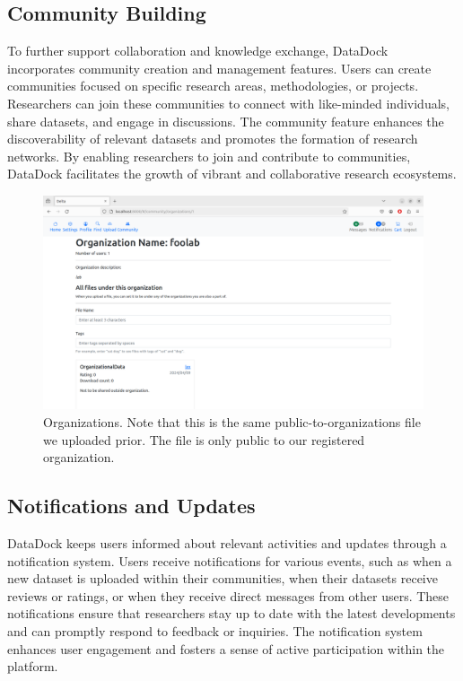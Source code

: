 \documentclass[conference]{IEEEtran}
\begin{document}
\subsection{Community Building}
To further support collaboration and knowledge exchange, DataDock incorporates community creation and management features. Users can create communities focused on specific research areas, methodologies, or projects. Researchers can join these communities to connect with like-minded individuals, share datasets, and engage in discussions. The community feature enhances the discoverability of relevant datasets and promotes the formation of research networks. By enabling researchers to join and contribute to communities, DataDock facilitates the growth of vibrant and collaborative research ecosystems.
\begin{figure}[h]
  \centering
  \includegraphics[width=\columnwidth]{figures/organization.png}
  \caption{Organizations. Note that this is the same public-to-organizations file we uploaded prior. The file is only public to our registered organization.}
  \label{fig:delta-organization}
\end{figure}

\subsection{Notifications and Updates}
DataDock keeps users informed about relevant activities and updates through a notification system. Users receive notifications for various events, such as when a new dataset is uploaded within their communities, when their datasets receive reviews or ratings, or when they receive direct messages from other users. These notifications ensure that researchers stay up to date with the latest developments and can promptly respond to feedback or inquiries. The notification system enhances user engagement and fosters a sense of active participation within the platform.
\end{document}
